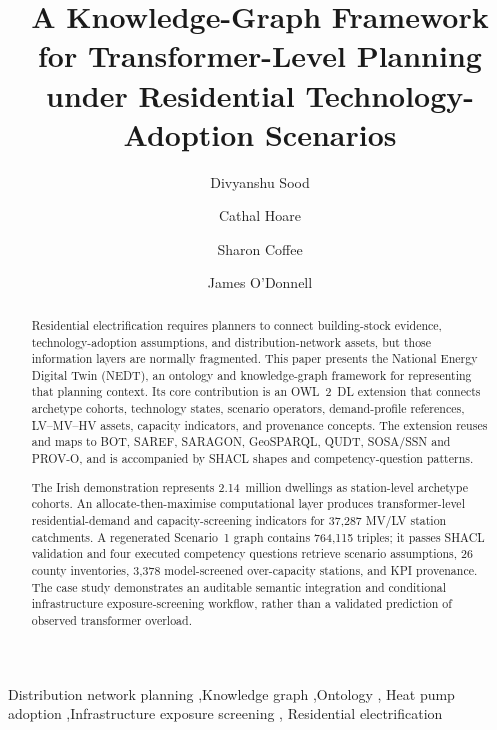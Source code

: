 \documentclass[preprint,12pt]{elsarticle}
\begin{document}
\begin{frontmatter}

\title{A Knowledge-Graph Framework for Transformer-Level Planning under
  Residential Technology-Adoption Scenarios}

\author[UCD]{Divyanshu Sood}
\author[UL]{Cathal Hoare}
\author[UCD]{Sharon Coffee}
\author[UL]{James O'Donnell}
\address[UCD]{UCD Energy Institute, University College Dublin, Ireland}
\address[UL]{University of Limerick, Ireland}

\begin{abstract}
Residential electrification requires planners to connect building-stock
evidence, technology-adoption assumptions, and distribution-network assets,
but those information layers are normally fragmented. This paper presents
the National Energy Digital Twin (NEDT), an ontology and knowledge-graph
framework for representing that planning context. Its core contribution is
an OWL~2~DL extension that connects archetype cohorts, technology states,
scenario operators, demand-profile references, LV--MV--HV assets, capacity
indicators, and provenance concepts. The extension reuses and maps to BOT,
SAREF, SARAGON, GeoSPARQL, QUDT, SOSA/SSN and PROV-O, and is accompanied by
SHACL shapes and competency-question patterns.

The Irish demonstration represents 2.14~million dwellings as station-level
archetype cohorts. An allocate-then-maximise computational layer produces
transformer-level residential-demand and capacity-screening indicators for
37,287 MV/LV station catchments. A regenerated Scenario~1 graph contains
764,115 triples; it passes SHACL validation and four executed competency
questions retrieve scenario assumptions, 26 county inventories, 3,378
model-screened over-capacity stations, and KPI provenance. The case study
demonstrates an auditable semantic integration and conditional infrastructure
exposure-screening workflow, rather than a validated prediction of observed
transformer overload.
\end{abstract}

\begin{keyword}
Distribution network planning \sep Knowledge graph \sep Ontology \sep
Heat pump adoption \sep Infrastructure exposure screening \sep
Residential electrification
\end{keyword}

\end{frontmatter}

\end{document}
